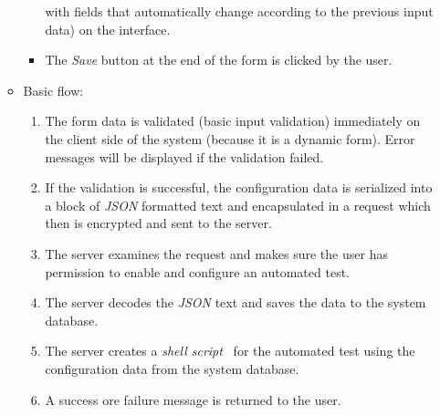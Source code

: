 \begin{enumerate}
\begin{itemize}
\begin{itemize}
                with fields that automatically change according to the previous
                input data) on the
                interface.
            \item The \emph{Save} button at the end of the form is clicked by
                the user.
        \end{itemize}
    \item Basic flow:
        \begin{enumerate}
            \item The form data is validated (basic input validation)
                immediately on the client side of the system (because it is a
                dynamic form). Error messages
                will be displayed if the validation failed.
            \item If the validation is successful, the configuration data is
                serialized into a block of \emph{JSON} \cite{JSON} formatted text and
                encapsulated in a request which then is encrypted and sent to
                the server.
            \item The server examines the request and makes sure the user has
                permission to enable and configure an automated test.
            \item The server decodes the \emph{JSON} text and saves the data to
                the system database.
            \item The server creates a \emph{shell script}~\cite{shellScript}
                for the automated test using the configuration data from the
                system database.
            \item A success ore failure message is returned to the user.
        \end{enumerate}
\end{itemize}


\end{enumerate}
